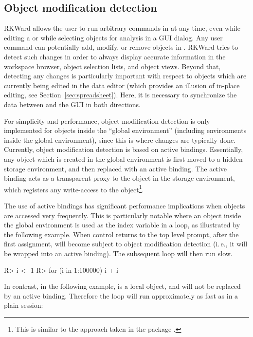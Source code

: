 \subsection{Object modification detection}
\label{sec:technical_omd}
RKWard allows the user to run arbitrary commands in  at any time, even while
editing a  or while selecting objects for analysis in a GUI dialog. Any user
command can potentially add, modify, or remove objects in . RKWard tries to
detect such changes in order to always display accurate information in the
workspace browser, object selection lists, and object views. Beyond that,
detecting any changes is particularly important with respect to objects which
are currently being edited in the data editor (which provides an illusion
of in-place editing, see Section~\ref{sec:spreadsheet}). Here, it is necessary to synchronize
the data between  and the GUI in both directions.

For simplicity and performance, object modification detection is only
implemented for objects inside the ``global environment'' (including environments
inside the global environment), since this is where changes are typically done.
Currently, object modification detection is based on active bindings.
Essentially, any object which is created in the global environment is first
moved to a hidden storage environment, and then replaced with an active binding.
The active binding acts as a transparent proxy to the object in the storage
environment, which registers any write-access to the object\footnote{
    This is similar to the approach taken in the  package \citep{Plate2009}.
}.

The use of active bindings has significant performance implications when
objects are accessed very frequently. This is particularly notable where an
object inside the global environment is used as the index variable in a loop,
as illustrated by the following example. When control returns to the top level
prompt, after the first assignment,  will become subject to object modification
detection (i.\,e., it will be wrapped into an active
binding). The subsequent  loop will then run slow.

\begin{Code}
R> i <- 1
R> for (i in 1:100000) i + i
\end{Code}

In contrast, in the following example,  is a local object, and will not
be replaced by an active binding. Therefore the loop will run approximately as fast
as in a plain  session:

